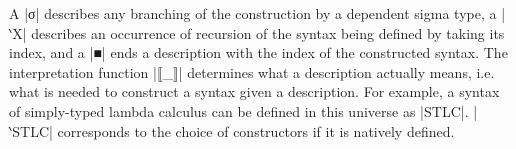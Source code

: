 \documentclass[sigplan,review,fleqn]{acmart}
\renewcommand{\verb}{\collectverb{\color{AgdaFunction}}}
\newcommand{\con}{\collectverb{\color{AgdaInductiveConstructor}}}
\begin{document}
A \con|σ| describes any branching of the construction by a dependent sigma type, a \con|‵X| describes an occurrence of recursion of the syntax being defined by taking its index, and a \con|■| ends a description with the index of the constructed syntax.
The interpretation function \verb|⟦_⟧| determines what a description actually means, i.e. what is needed to construct a syntax given a description.
For example, a syntax of simply-typed lambda calculus can be defined in this universe as \verb|STLC|.
\verb|‵STLC| corresponds to the choice of constructors if it is natively defined.
\begin{code}
\>[0]\AgdaSpace{}%
\AgdaSpace{}%
\AgdaSymbol{:}\AgdaSpace{}%
\AgdaSpace{}%
\<%
\\
\>[0][@{}l@{\AgdaIndent{0}}]%
\>[2]\AgdaSpace{}%
\AgdaSymbol{:}\AgdaSpace{}%
\<%
\\
%
\>[2]\AgdaSpace{}%
\AgdaSymbol{:}\AgdaSpace{}%
\AgdaSpace{}%
\AgdaSpace{}%
\AgdaSpace{}%
\AgdaSpace{}%
\<%
\\
%
\\[\AgdaEmptyExtraSkip]%
\>[0]\AgdaSpace{}%
\AgdaSpace{}%
\AgdaSymbol{:}\AgdaSpace{}%
\AgdaSpace{}%
\<%
\\
\>[0][@{}l@{\AgdaIndent{0}}]%
\>[2]\AgdaSpace{}%
\AgdaSpace{}%
\AgdaSymbol{:}\AgdaSpace{}%
\AgdaSpace{}%
\AgdaSpace{}%
\AgdaSpace{}%
\AgdaSpace{}%
\<%
\\
%
\\[\AgdaEmptyExtraSkip]%
\>[0]\AgdaSpace{}%
\AgdaSymbol{:}\AgdaSpace{}%
\AgdaSpace{}%
\<%
\\
\>[0]\AgdaSpace{}%
\AgdaSymbol{=}\AgdaSpace{}%
\AgdaSpace{}%
\AgdaSpace{}%
\AgdaSpace{}%
\<%
\\
\>[0][@{}l@{\AgdaIndent{0}}]%
\>[2]\AgdaSymbol{(}\AgdaSpace{}%
\AgdaSpace{}%
\AgdaSymbol{)}\AgdaSpace{}%
\AgdaSpace{}%
\AgdaSpace{}%

\end{code}
\end{document}
